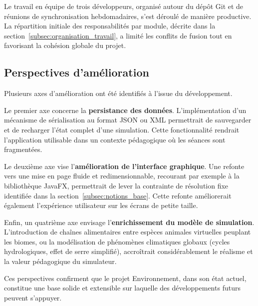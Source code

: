 Le travail en équipe de trois développeurs, organisé autour du dépôt Git et de
réunions de synchronisation hebdomadaires, s'est déroulé de manière productive.
La répartition initiale des responsabilités par module, décrite dans la
section~\ref{subsec:organisation_travail}, a limité les conflits de fusion tout
en favorisant la cohésion globale du projet.

\subsection{Perspectives d'amélioration}
\label{subsec:perspectives}

Plusieurs axes d'amélioration ont été identifiés à l'issue du développement.

Le premier axe concerne la \textbf{persistance des données}. L'implémentation d'un
mécanisme de sérialisation au format JSON ou XML permettrait de sauvegarder et de
recharger l'état complet d'une simulation. Cette fonctionnalité rendrait
l'application utilisable dans un contexte pédagogique où les séances sont
fragmentées.

Le deuxième axe vise l'\textbf{amélioration de l'interface graphique}. Une
refonte vers une mise en page fluide et redimensionnable, recourant par exemple à
la bibliothèque JavaFX, permettrait de lever la contrainte de résolution fixe
identifiée dans la section~\ref{subsec:notions_base}. Cette refonte améliorerait
également l'expérience utilisateur sur les écrans de petite taille.

Enfin, un quatrième axe envisage l'\textbf{enrichissement du modèle de simulation}.
L'introduction de chaînes alimentaires entre espèces animales virtuelles peuplant
les biomes, ou la modélisation de phénomènes climatiques globaux (cycles
hydrologiques, effet de serre simplifié), accroîtrait considérablement le réalisme
et la valeur pédagogique du simulateur.

Ces perspectives confirment que le projet Environnement, dans son état actuel,
constitue une base solide et extensible sur laquelle des développements futurs
peuvent s'appuyer.
